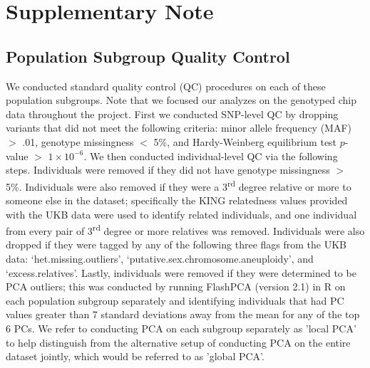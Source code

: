 


\section{Supplementary Note}\label{Supplementary-Note}

\subsection{Population Subgroup Quality Control}

We conducted standard quality control (QC) procedures on each of these population subgroups. Note that we focused our analyzes on the genotyped chip data throughout the project. First we conducted SNP-level QC by dropping variants that did not meet the following criteria:  minor allele frequency (MAF) $>$ .01, genotype missingness $<$ 5\%, and Hardy-Weinberg equilibrium test $p$-value $>$ $1\times10^{-6}$. We then conducted individual-level QC via the following steps. Individuals were removed if they did not have genotype missingness $>$ 5\%. Individuals were also removed if they were a 3\textsuperscript{rd} degree relative or more to someone else in the dataset; specifically the KING relatedness values provided with the UKB data were used to identify related individuals, and one individual from every pair of 3\textsuperscript{rd} degree or more relatives was removed. Individuals were also dropped if they were tagged by any of the following three flags from the UKB data: `het.missing.outliers', `putative.sex.chromosome.aneuploidy', and `excess.relatives'. Lastly, individuals were removed if they were determined to be PCA outliers; this was conducted by running FlashPCA (version 2.1) \citep{Abraham2017} in R on each population subgroup separately and identifying individuals that had PC values greater than 7 standard deviations away from the mean for any of the top 6 PCs. We refer to conducting PCA on each subgroup separately as 'local PCA' to help distinguish from the alternative setup of conducting PCA on the entire dataset jointly, which would be referred to as 'global PCA'. 

